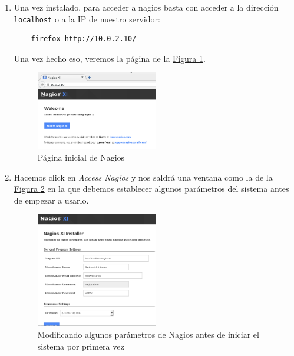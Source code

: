 \documentclass[10pt,a4paper,spanish]{article}
\numberwithin{equation}{section} %
\numberwithin{figure}{section} %
\numberwithin{table}{section} %
\begin{document}
\begin{enumerate}[1.]
    \item Una vez instalado, para acceder a nagios basta con acceder a la dirección \texttt{localhost} o a la IP de nuestro servidor:
    \begin{verbatim}
    firefox http://10.0.2.10/
    \end{verbatim}

    Una vez hecho eso, veremos la página de la \hyperref[paginicialnagios]{Figura \ref*{paginicialnagios}}.

    \begin{figure}[!h]
        \centering
        \includegraphics[width=0.5\textwidth]{29}
        \caption{Página inicial de Nagios}
        \label{paginicialnagios}
    \end{figure}

    \item Hacemos click en \textit{Access Nagios} y nos saldrá una ventana como la de la \hyperref[ventanainstall]{Figura \ref*{ventanainstall}} en la que debemos establecer algunos parámetros del sistema antes de empezar a usarlo.

    \begin{figure}[!h]
        \centering
        \includegraphics[width=0.5\textwidth]{30}
        \caption{Modificando algunos parámetros de Nagios antes de iniciar el sistema por primera vez}
        \label{ventanainstall}
    \end{figure}


\end{enumerate}
\end{document}
